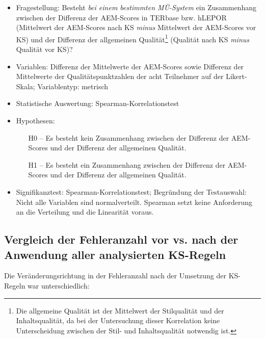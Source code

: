 \begin{itemize}
\item Fragestellung: Besteht \textit{bei einem bestimmten MÜ-System} ein Zusammenhang zwischen der Differenz der AEM-Scores in TERbase bzw. hLEPOR (Mittelwert der AEM-Scores nach KS \textit{minus} Mittelwert der AEM-Scores vor KS) und der Differenz der allgemeinen Qualität\footnote{\textrm{Die allgemeine Qualität ist der Mittelwert der Stilqualität und der Inhaltsqualität, da bei der Untersuchung dieser Korrelation keine Unterscheidung zwischen} {{{der Stil- und Inhaltsqualität}}} \textrm{notwendig ist.}} (Qualität nach KS \textit{minus} Qualität vor KS)?

\item Variablen: Differenz der Mittelwerte der AEM-Scores sowie Differenz der Mittelwerte der Qualitätspunktzahlen der acht Teilnehmer auf der Likert-Skala; Variablentyp: metrisch

\item Statistische Auswertung: Spearman-Korrelationstest

\item Hypothesen:

\begin{itemize}

\item[H0 --] Es besteht kein Zusammenhang zwischen der Differenz der AEM-Scores und der Differenz der allgemeinen Qualität.

\item[H1 --] Es besteht ein Zusammenhang zwischen der Differenz der AEM-Scores und der Differenz der allgemeinen Qualität.

\end{itemize}
\item Signifikanztest: Spearman-Korrelationstest; Begründung der Testauswahl: Nicht alle Variablen sind normalverteilt. Spearman setzt keine Anforderung an die Verteilung und die Linearität voraus.

\end{itemize}


\subsection{Vergleich der Fehleranzahl vor vs. nach der Anwendung aller analysierten KS-Regeln}\label{sec:5.4.1}

Die Veränderungsrichtung in der Fehleranzahl nach der Umsetzung der KS-Re\-geln war unterschiedlich:


